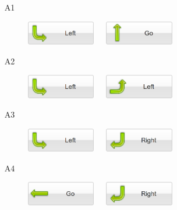 \begin{enumerate}
\begin{enumerate}
\item[A1] 
\begin{figure}[!ht]
\begin{center}
\includegraphics[width=3cm]{img/button-left-4.png}\ \ \
\includegraphics[width=3cm]{img/button-go-2.png}
\end{center}
\end{figure}
\item[A2] 
\begin{figure}[!ht]
\begin{center}
\includegraphics[width=3cm]{img/button-left-4.png}\ \ \
\includegraphics[width=3cm]{img/button-left-1.png}
\end{center}
\end{figure}
\item[A3] 
\begin{figure}[!ht]
\begin{center}
\includegraphics[width=3cm]{img/button-left-4.png}\ \ \
\includegraphics[width=3cm]{img/button-right-4.png}
\end{center}
\end{figure}
\item[A4] 
\begin{figure}[!ht]
\begin{center}
\includegraphics[width=3cm]{img/button-go-3.png}\ \ \
\includegraphics[width=3cm]{img/button-right-4.png}
\end{center}
\end{figure}
\end{enumerate}
\end{enumerate}

